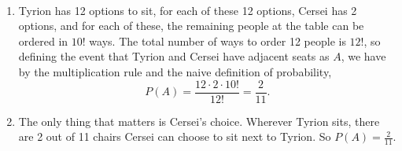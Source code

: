 
\setcounter{theorem}{37}

\begin{exercise}[BH.1.38]
\begin{solution}~
	\begin{enumerate}
		\item Tyrion has 12 options to sit, for each of these 12 options, Cersei has 2 options, and for each of these, the remaining people at the table can be ordered in $10!$ ways. The total number of ways to order 12 people is $12!$, so defining the event that Tyrion and Cersei have adjacent seats as $A$, we have by the multiplication rule and the naive definition of probability,
			$$P(A) = \frac{12 \cdot 2\cdot 10!}{12!} = \frac{2}{11}.$$
		\item The only thing that matters is Cersei's choice. Wherever Tyrion sits, there are 2 out of 11 chairs Cersei can choose to sit next to Tyrion. So $P(A) = \frac{2}{11}$.
	\end{enumerate}
\end{solution}
\end{exercise}


